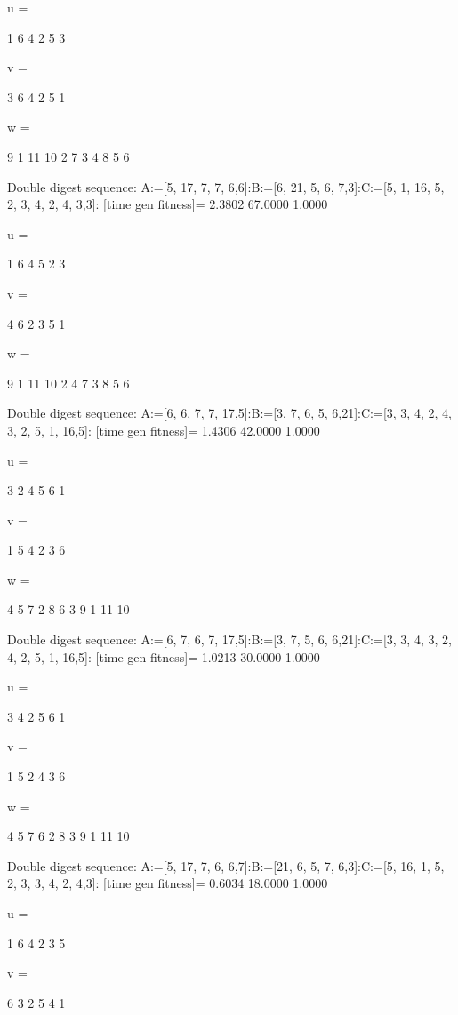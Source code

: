 u =

     1     6     4     2     5     3


v =

     3     6     4     2     5     1


w =

     9     1    11    10     2     7     3     4     8     5     6

Double digest sequence:
A:=[5, 17, 7, 7, 6,6]:B:=[6, 21, 5, 6, 7,3]:C:=[5, 1, 16, 5, 2, 3, 4, 2, 4, 3,3]:
[time gen fitness]=
    2.3802   67.0000    1.0000


u =

     1     6     4     5     2     3


v =

     4     6     2     3     5     1


w =

     9     1    11    10     2     4     7     3     8     5     6

Double digest sequence:
A:=[6, 6, 7, 7, 17,5]:B:=[3, 7, 6, 5, 6,21]:C:=[3, 3, 4, 2, 4, 3, 2, 5, 1, 16,5]:
[time gen fitness]=
    1.4306   42.0000    1.0000


u =

     3     2     4     5     6     1


v =

     1     5     4     2     3     6


w =

     4     5     7     2     8     6     3     9     1    11    10

Double digest sequence:
A:=[6, 7, 6, 7, 17,5]:B:=[3, 7, 5, 6, 6,21]:C:=[3, 3, 4, 3, 2, 4, 2, 5, 1, 16,5]:
[time gen fitness]=
    1.0213   30.0000    1.0000


u =

     3     4     2     5     6     1


v =

     1     5     2     4     3     6


w =

     4     5     7     6     2     8     3     9     1    11    10

Double digest sequence:
A:=[5, 17, 7, 6, 6,7]:B:=[21, 6, 5, 7, 6,3]:C:=[5, 16, 1, 5, 2, 3, 3, 4, 2, 4,3]:
[time gen fitness]=
    0.6034   18.0000    1.0000


u =

     1     6     4     2     3     5


v =

     6     3     2     5     4     1


